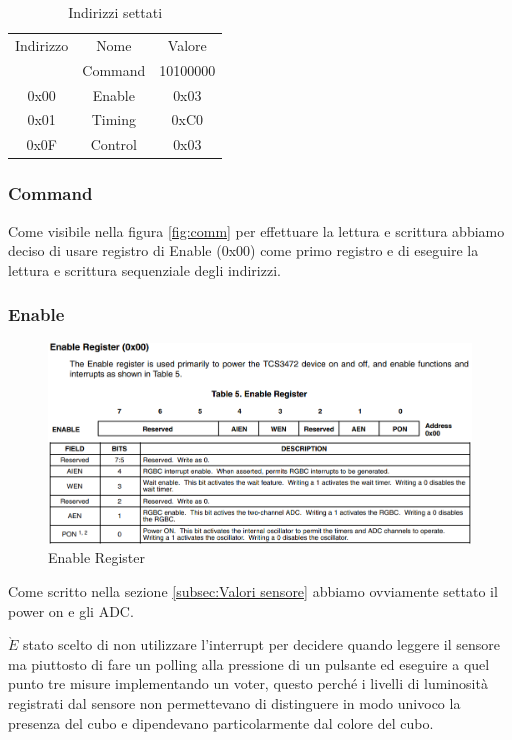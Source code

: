 \documentclass[12pt]{report}
\begin{document}
\label{subsec:Valori sensore}
\begin{table}[h]
    \centering
    \begin{tabular}{ccc}
        Indirizzo & Nome & Valore \\
             & Command & 10100000 \\
        0x00 & Enable & 0x03 \\
        0x01 & Timing & 0xC0 \\
        0x0F & Control & 0x03
    \end{tabular}
    \caption{Indirizzi settati}
    \label{tab:my_label}
\end{table}

\subsubsection{Command}

Come visibile nella figura \ref{fig:comm} per effettuare la lettura e scrittura abbiamo deciso di usare registro di Enable (0x00) come primo registro e di eseguire la lettura e scrittura sequenziale degli indirizzi.

\subsubsection{Enable}

\begin{figure}[H] 
    \centering
    \includegraphics[width=0.65\linewidth]{images/Immagini sensore/registro enable.png}
    \caption{Enable Register}
\end{figure}

Come scritto nella sezione \ref{subsec:Valori sensore} abbiamo ovviamente settato il power on e gli ADC.

$\grave{E}$ stato scelto di non utilizzare l'interrupt per decidere quando leggere il sensore ma piuttosto di fare un polling alla pressione di un pulsante ed eseguire a quel punto tre misure implementando un voter, 
questo perché i livelli di luminosità registrati dal sensore non permettevano di distinguere in modo univoco la presenza del cubo e dipendevano particolarmente dal colore del cubo.
\end{document}
